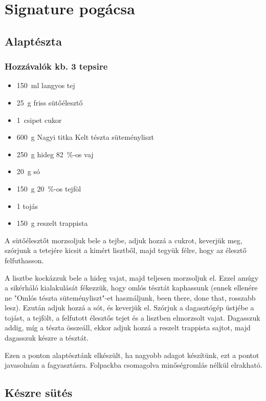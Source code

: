 \newpage
\section{Signature pogácsa} \label{sec:signature-pogacsa}

\subsection*{Alaptészta}
\subsubsection*{Hozzávalók kb. 3 tepsire}
\begin{itemize}
    \item \qty{150}{\ml} langyos tej
    \item \qty{25}{\g} friss sütőélesztő
    \item \qty{1}{csipet} cukor
    \item \qty{600}{\g} Nagyi titka Kelt tészta süteményliszt
    \item \qty{250}{\g} hideg \qty{82}{\percent}-os vaj
    \item \qty{20}{\g} só
    \item \qty{150}{g} \qty{20}{\percent}-os tejföl
    \item \num{1} tojás
    \item \qty{150}{\g} reszelt trappista
\end{itemize}

A sütőélesztőt morzsoljuk bele a tejbe, adjuk hozzá a cukrot, keverjük meg, szórjunk a tetejére kicsit a kimért lisztből, majd tegyük félre, hogy az élesztő felfuthasson.

A lisztbe kockázzuk bele a hideg vajat, majd teljesen morzsoljuk el. Ezzel amúgy a sikérháló kialakulását fékezzük, hogy omlós tésztát kaphassunk (ennek ellenére ne "Omlós tészta süteményliszt"-et használjunk, been there, done that, rosszabb lesz). Ezután adjuk hozzá a sót, és keverjük el. Szórjuk a dagasztógép üstjébe a tojást, a tejfölt, a felfutott élesztős tejet és a lisztben elmorzsolt vajat. Dagasszuk addig, míg a tészta összeáll, ekkor adjuk hozzá a reszelt trappista sajtot, majd dagasszuk készre a tésztát.

Ezen a ponton alaptésztánk elkészült, ha nagyobb adagot készítünk, ezt a pontot javasolnám a fagyasztásra. Folpackba csomagolva minőségromlás nélkül elrakható.

\subsection*{Készre sütés}
